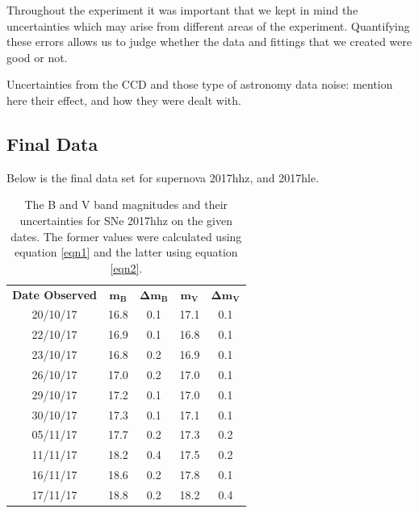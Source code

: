 \documentclass[twocolumn]{revtex4}
\begin{document}
Throughout the experiment it was important that we kept in mind the uncertainties which may arise from different areas of the experiment. Quantifying these errors allows us to judge whether the data and fittings that we created were good or not. 

Uncertainties from the CCD and those type of astronomy data noise: mention here their effect, and how they were dealt with. 

\vspace{-3ex}
\subsection{Final Data}
\vspace{-2ex}

Below is the final data set for supernova 2017hhz, and 2017hle. 

\begin{table}[h!]
\centering
\begin{tabular}{c@{\hskip 20pt}c@{\hskip 20pt}c@{\hskip 20pt}c@{\hskip 20pt}c} 
 \hline
 \textbf{Date Observed} & \textbf{$\boldsymbol{m_B}$} & \textbf{$\boldsymbol{\Delta{m_B}}$} & \textbf{$\boldsymbol{m_V}$} & \textbf{$\boldsymbol{\Delta{m_V}}$} \\ [0.5ex] 
 20/10/17 & 16.8 & 0.1 & 17.1 & 0.1 \\
 22/10/17 & 16.9 & 0.1 & 16.8 & 0.1 \\
 23/10/17 & 16.8 & 0.2 & 16.9 & 0.1 \\
 26/10/17 & 17.0 & 0.2 & 17.0 & 0.1 \\
 29/10/17 & 17.2 & 0.1 & 17.0 & 0.1 \\
 30/10/17 & 17.3 & 0.1 & 17.1 & 0.1 \\
 05/11/17 & 17.7 & 0.2 & 17.3 & 0.2 \\
 11/11/17 & 18.2 & 0.4 & 17.5 & 0.2 \\
 16/11/17 & 18.6 & 0.2 & 17.8 & 0.1 \\
 17/11/17 & 18.8 & 0.2 & 18.2 & 0.4 \\
 \hline
\end{tabular}
\caption{The B and V band magnitudes and their uncertainties for SNe 2017hhz on the given dates. The former values were calculated using equation \ref{eqn1} and the latter using equation \ref{eqn2}.}
\label{2017hhz-table}
\end{table}
\end{document}
